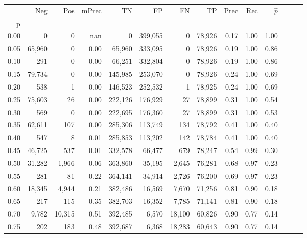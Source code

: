 \begin{tabular}{rrrrrrrrrrrrrr}
\toprule
{} &     Neg &     Pos & mPrec &       TN &       FP &      FN &      TP &  Prec &   Rec & $\hat{p}$ \\
p    &         &         &       &          &          &         &         &       &       &           \\
\midrule
0.00 &       0 &       0 &   nan &        0 &  399,055 &       0 &  78,926 &  0.17 &  1.00 &      1.00 \\
0.05 &  65,960 &       0 &  0.00 &   65,960 &  333,095 &       0 &  78,926 &  0.19 &  1.00 &      0.86 \\
0.10 &     291 &       0 &  0.00 &   66,251 &  332,804 &       0 &  78,926 &  0.19 &  1.00 &      0.86 \\
0.15 &  79,734 &       0 &  0.00 &  145,985 &  253,070 &       0 &  78,926 &  0.24 &  1.00 &      0.69 \\
0.20 &     538 &       1 &  0.00 &  146,523 &  252,532 &       1 &  78,925 &  0.24 &  1.00 &      0.69 \\
0.25 &  75,603 &      26 &  0.00 &  222,126 &  176,929 &      27 &  78,899 &  0.31 &  1.00 &      0.54 \\
0.30 &     569 &       0 &  0.00 &  222,695 &  176,360 &      27 &  78,899 &  0.31 &  1.00 &      0.53 \\
0.35 &  62,611 &     107 &  0.00 &  285,306 &  113,749 &     134 &  78,792 &  0.41 &  1.00 &      0.40 \\
0.40 &     547 &       8 &  0.01 &  285,853 &  113,202 &     142 &  78,784 &  0.41 &  1.00 &      0.40 \\
0.45 &  46,725 &     537 &  0.01 &  332,578 &   66,477 &     679 &  78,247 &  0.54 &  0.99 &      0.30 \\
0.50 &  31,282 &   1,966 &  0.06 &  363,860 &   35,195 &   2,645 &  76,281 &  0.68 &  0.97 &      0.23 \\
0.55 &     281 &      81 &  0.22 &  364,141 &   34,914 &   2,726 &  76,200 &  0.69 &  0.97 &      0.23 \\
0.60 &  18,345 &   4,944 &  0.21 &  382,486 &   16,569 &   7,670 &  71,256 &  0.81 &  0.90 &      0.18 \\
0.65 &     217 &     115 &  0.35 &  382,703 &   16,352 &   7,785 &  71,141 &  0.81 &  0.90 &      0.18 \\
0.70 &   9,782 &  10,315 &  0.51 &  392,485 &    6,570 &  18,100 &  60,826 &  0.90 &  0.77 &      0.14 \\
0.75 &     202 &     183 &  0.48 &  392,687 &    6,368 &  18,283 &  60,643 &  0.90 &  0.77 &      0.14 \\

\end{tabular}
